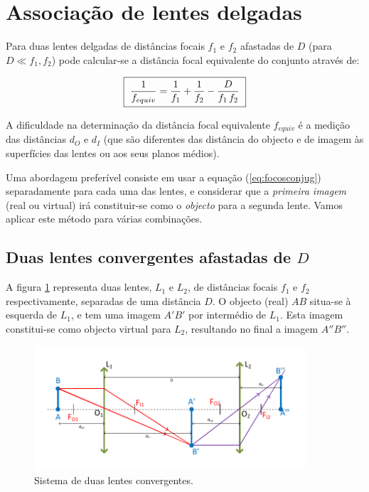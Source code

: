 \documentclass[a4paper,12pt]{article}      %
\begin{document}

\section{\sf Associação de lentes delgadas}

Para duas lentes delgadas de distâncias focais $f_1$ e $f_2$ afastadas de $D$ (para $D \ll f_1,f_2$) pode calcular-se a distância focal equivalente do conjunto através de: 

 \begin{equation}
	\label{eq:assoclentes}
    \fbox{
        $ \displaystyle
	\frac{1}{f_{equiv}} = \frac{1}{f_1} + \frac{1}{f_2} - \frac{D}{f_1 \,f_2} 
        $
    }
\end{equation}

A dificuldade
na determinação da distância focal equivalente ${f_{equiv}}$ é a medição das distâncias $d_O$ e $d_I$ 
(que são diferentes das distância do objecto e de imagem às superfícies das lentes ou aos seus planos médios).

Uma abordagem preferível consiste em usar a equação (\ref{eq:focosconjug}) separadamente para cada uma das lentes, e considerar que a \emph{primeira imagem} (real ou virtual) irá constituir-se como o \emph{objecto} para a segunda lente. Vamos aplicar este método para várias combinações.

\subsection{\sf Duas lentes convergentes afastadas de $D$}
A figura \ref{fig:DuplaConvConv1} representa duas lentes, $L_1$ e $L_2$, de distâncias focais $f_1$ e $f_2$ respectivamente, separadas de uma distância $D$. O objecto (real) $AB$ situa-se à esquerda de $L_1$, e tem uma imagem $A'B'$ por intermédio de $L_1$. Esta imagem constitui-se como objecto virtual para $L_2$, resultando no final a imagem $A''B''$.

\begin{figure}	[!htb]  \centering 
	\includegraphics[width=0.9\textwidth]{9-DuplaConvConv1}
	\caption{Sistema de duas lentes convergentes. \label{fig:DuplaConvConv1}} 
\end{figure}
\end{document}

